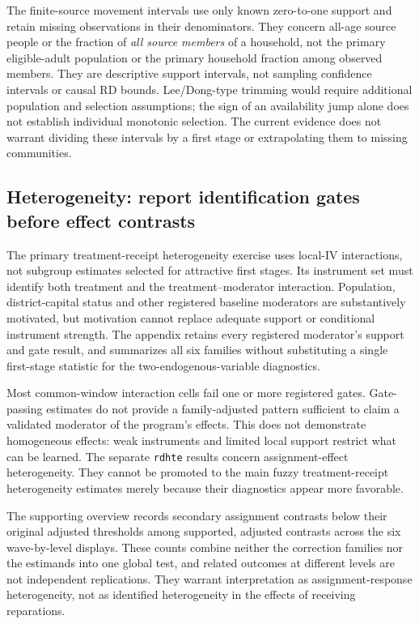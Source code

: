 The finite-source movement intervals use only known zero-to-one support and
retain missing observations in their denominators. They concern all-age
source people or the fraction of \emph{all source members} of a household,
not the primary eligible-adult population or the primary household fraction
among observed members. They are descriptive support intervals, not sampling
confidence intervals or causal RD bounds. Lee/Dong-type trimming would
require additional population and selection assumptions; the sign of an
availability jump alone does not establish individual monotonic selection.
The current evidence does not warrant dividing these intervals by a first
stage or extrapolating them to missing communities.

\subsection{Heterogeneity: report identification gates before effect contrasts}

The primary treatment-receipt heterogeneity exercise uses local-IV
interactions, not subgroup estimates selected for attractive first stages.
Its instrument set must identify both treatment and the treatment--moderator
interaction. Population, district-capital status and other registered
baseline moderators are substantively motivated, but motivation cannot
replace adequate support or conditional instrument strength. The appendix
retains every registered moderator's support and gate result, and summarizes
all six families without substituting a single first-stage statistic for
the two-endogenous-variable diagnostics.

Most common-window interaction cells fail one or more registered gates.
Gate-passing estimates do not provide a family-adjusted pattern sufficient
to claim a validated moderator of the program's effects. This does not
demonstrate homogeneous effects: weak instruments and limited local
support restrict what can be learned. The separate \texttt{rdhte} results
concern assignment-effect heterogeneity. They cannot be promoted to the main
fuzzy treatment-receipt heterogeneity estimates merely because their
diagnostics appear more favorable.

The supporting overview records \AssignmentSignals{} secondary assignment
contrasts below their original adjusted thresholds among \AssignmentAdjusted{}
supported, adjusted contrasts across the six wave-by-level displays. These
counts combine neither the correction families nor the estimands into one
global test, and related outcomes at different levels are not independent
replications. They warrant interpretation as assignment-response heterogeneity,
not as identified heterogeneity in the effects of receiving reparations.

